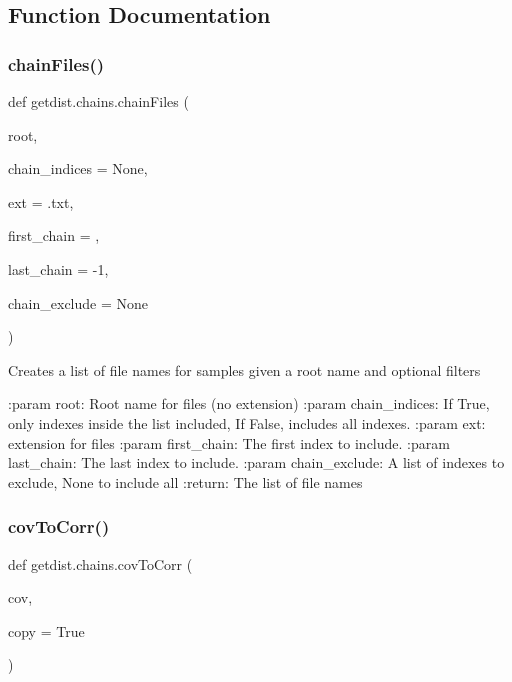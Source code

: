 \subsection{Function Documentation}
\mbox{\label{namespacegetdist_1_1chains_a4b7fca3560b676d80b95f038f023bde2}} 
\subsubsection{\texorpdfstring{chain\+Files()}{chainFiles()}}
{\footnotesize\ttfamily def getdist.\+chains.\+chain\+Files (\begin{DoxyParamCaption}\item[{}]{root,  }\item[{}]{chain\+\_\+indices = {\ttfamily None},  }\item[{}]{ext = {\ttfamily \textquotesingle{}.txt\textquotesingle{}},  }\item[{}]{first\+\_\+chain = {},  }\item[{}]{last\+\_\+chain = {\ttfamily -\/1},  }\item[{}]{chain\+\_\+exclude = {\ttfamily None} }\end{DoxyParamCaption})}

\begin{DoxyVerb}Creates a list of file names for samples given a root name and optional filters

:param root: Root name for files (no extension)
:param chain_indices: If True, only indexes inside the list included, If False, includes all indexes.
:param ext: extension for files
:param first_chain: The first index to include.
:param last_chain: The last index to include.
:param chain_exclude: A list of indexes to exclude, None to include all
:return: The list of file names
\end{DoxyVerb}
 \mbox{\label{namespacegetdist_1_1chains_ab06bc0bb109554727a57f915baa61c36}} 
\subsubsection{\texorpdfstring{cov\+To\+Corr()}{covToCorr()}}
{\footnotesize\ttfamily def getdist.\+chains.\+cov\+To\+Corr (\begin{DoxyParamCaption}\item[{}]{cov,  }\item[{}]{copy = {\ttfamily True} }\end{DoxyParamCaption})}

